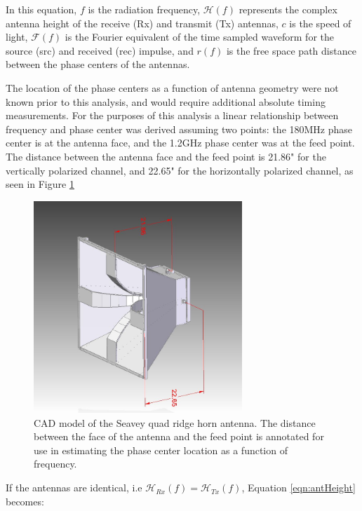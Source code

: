 In this equation, $f$ is the radiation frequency, $\mathcal{H}(f)$ represents the complex antenna height of the receive (Rx) and transmit (Tx) antennas, $c$ is the speed of light, $\mathcal{F}(f)$ is the Fourier equivalent of the time sampled waveform for the source (src) and received (rec) impulse, and $r(f)$ is the free space path distance between the phase centers of the antennas.  

The location of the phase centers as a function of antenna geometry were not known prior to this analysis, and would require additional absolute timing measurements.  For the purposes of this analysis a linear relationship between frequency and phase center was derived assuming two points: the 180MHz phase center is at the antenna face, and the 1.2GHz phase center was at the feed point.  The distance between the antenna face and the feed point is 21.86" for the vertically polarized channel, and 22.65" for the horizontally polarized channel, as seen in Figure \ref{fig:antDim}

	
\begin{figure}
\centering
	\includegraphics[width=0.7\textwidth]{../figures/ANITA_HORN_FEED_DIM}
	\caption{CAD model of the Seavey quad ridge horn antenna.  The distance between the face of the antenna and the feed point is annotated for use in estimating the phase center location as a function of frequency.}
\label{fig:antDim}
\end{figure}



If the antennas are identical, i.e $\mathcal{H}_{Rx}(f) = \mathcal{H}_{Tx}(f)$, Equation \ref{eqn:antHeight} becomes:

